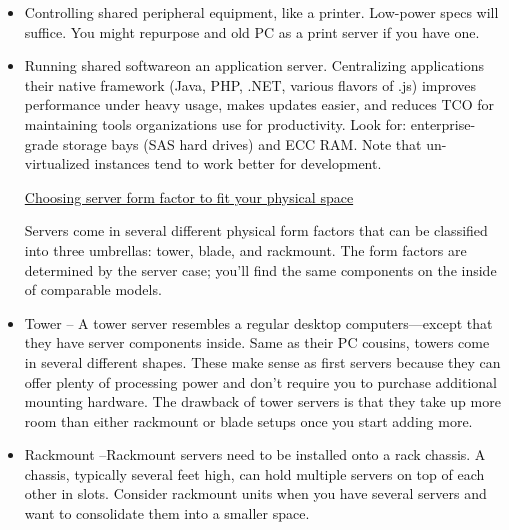 \documentclass[12pt]{report}
\renewcommand{\_}{\kern-1.5pt\textunderscore\kern-1.5pt}
\begin{document}
\begin{itemize}
	\item {\fontsize{13pt}{15.6pt}\selectfont \textcolor[HTML]{0D0D0D}{Controlling shared peripheral equipment, like a printer. Low-power specs will suﬃce. You might repurpose and old PC as a print server if you have one.}\par}\par

	\item {\fontsize{13pt}{15.6pt}\selectfont \textcolor[HTML]{0D0D0D}{Running shared softwareon an application server. Centralizing applications their native framework (Java, PHP, .NET, various flavors of .js) improves performance under heavy usage, makes updates easier, and reduces TCO for maintaining tools organizations use for productivity. Look for: enterprise-grade storage bays (SAS hard drives) and ECC RAM. Note that un-virtualized instances tend to work better for development.}\par}\par


\vspace{\baselineskip}\textcolor[HTML]{0D0D0D}{\uline{Choosing server form factor to fit your physical space}}\par

\textcolor[HTML]{0D0D0D}{Servers come in several diﬀerent physical form factors that can be classified into three umbrellas: tower, blade, and rackmount. The form factors are determined by the server case; you’ll find the same components on the inside of comparable models.}\par

	\item {\fontsize{13pt}{15.6pt}\selectfont \textcolor[HTML]{0D0D0D}{Tower – A tower server resembles a regular desktop computers—except that they have server components inside. Same as their PC cousins, towers come in several diﬀerent shapes. These make sense as first servers because they can oﬀer plenty of processing power and don’t require you to purchase additional mounting hardware. The drawback of tower servers is that they take up more room than either rackmount or blade setups once you start adding more.}\par}\par

	\item {\fontsize{13pt}{15.6pt}\selectfont \textcolor[HTML]{0D0D0D}{Rackmount –Rackmount servers need to be installed onto a rack chassis. A chassis, typically several feet high, can hold multiple servers on top of each other in slots. Consider rackmount units when you have several servers and want to consolidate them into a smaller space.}\par}\par


\end{itemize}
\end{document}
